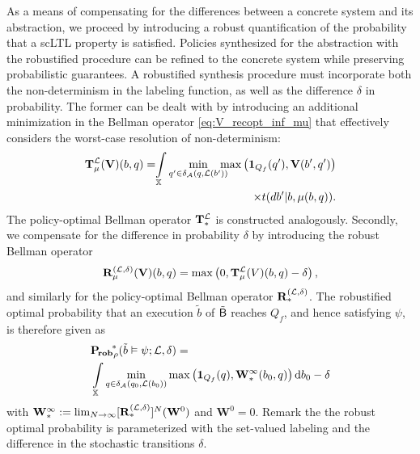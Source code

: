 \documentclass{ifacconf}
\begin{document}
As a means of compensating for the differences between a concrete system and its abstraction, we proceed by introducing a robust quantification of the probability that a scLTL property is satisfied. Policies synthesized for the abstraction with the robustified procedure can be refined to the concrete system while preserving probabilistic guarantees. A robustified synthesis procedure must incorporate both the non-determinism in the labeling function, as well as the difference $\delta$ in probability. The former can be dealt with by introducing an additional minimization in the Bellman operator \eqref{eq:V_recopt_inf_mu} that effectively considers the worst-case resolution of non-determinism:
\begin{equation}
\label{eq:V_recopt_nondet}
\begin{aligned}
  \Bel_\pol^\Labset (\mathbf V)(b,q) = \hspace{-1mm} \int_\X
  \min_{q' \in \delta_\FSA(q, \Labset( b'))} \hspace{-3mm} \max \left( \mathbf 1_{Q_f}(q'), \mathbf V( b',q') \right)  \\
   \times {\tr}(d b'|b,\pol(b,q)).
\end{aligned}
\end{equation}
The policy-optimal Bellman operator ${\mathbf {T}}_\ast^{\mathcal{L}}$ is constructed analogously. Secondly, we compensate for the difference in probability $\delta$ by introducing the robust Bellman operator
\begin{equation}
  \label{eq:V_recopt_nondet_rob}
  {\mathbf {R}}_{\mu}^{(\mathcal{L},\delta)} (\mathbf V)(b,q) = \max \left( 0, {\mathbf {T}}_{\mu}^{\mathcal{L}} (V)(b,q) - \delta  \right),
\end{equation}
and similarly for the policy-optimal Bellman operator ${\mathbf {R}}_\ast^{(\mathcal{L}, \delta)}$. The robustified optimal probability that an execution $\tilde b$ of $\tilde {\mathsf{B}}$ reaches $Q_f$, and hence satisfying $\psi$, is therefore given as
\begin{equation}
\label{eq:prob:robust_optimal}
\begin{aligned}
  &\mathbf{P_{\! rob}}_\init^{\!\ast} (\tilde b \vDash \psi; \Labset,\delta) =\\ & \int_{\X}\min_{\bar q \in \delta_\FSA(q_0,\Labset(b_0))}  \max \left( \mathbf 1_{Q_f}(\bar q), \mathbf W^\infty_\ast(b_0,\bar q) \right) \mathrm{d} b_0 -\delta
\end{aligned}
\end{equation}
with
$\mathbf W^\infty_\ast :=  \lim_{N\rightarrow\infty}[{\mathbf {R}}_\ast^{(\mathcal{L},\delta)}]^N (\mathbf W^0)$ and $\mathbf W^0=0$. Remark the the robust optimal probability is parameterized with the set-valued labeling and the difference in the stochastic transitions $\delta$.
\end{document}
